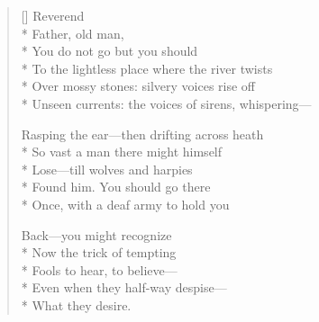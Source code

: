 \label{ch:lear_al}
\settowidth{\versewidth}{Unseen currents: the voices of sirens, whispering---}
\begin{verse}[\versewidth]
\qquad \qquad Reverend\\*
Father, old man,\\*
You do not go but you should\\*
To the lightless place where the river twists\\*
Over mossy stones: silvery voices rise off\\*
Unseen currents: the voices of sirens, whispering---

Rasping the ear---then drifting across heath\\*
So vast a man there might himself\\*
Lose---till wolves and harpies\\*
Found him.     You should go there\\*
Once, with a deaf army to hold you

Back---you might recognize\\*
Now the trick of tempting\\*
Fools to hear, to believe---\\*
Even when they half-way despise---\\*
What they desire.
\end{verse}
